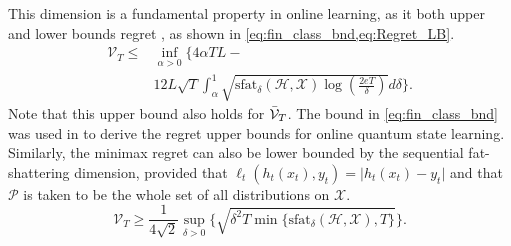This dimension is a fundamental property in online learning, as it both upper and lower bounds regret \citep{rakhlin2015online, rakhlin2015sequential}, as shown in \cref{eq:fin_class_bnd,eq:Regret_LB}.
\begin{equation}
\label{eq:fin_class_bnd}
\begin{aligned}
    \mathcal{V}_T \leq & \inf_{\alpha > 0} \Big\{ 4 \alpha T L - \\ & 12 L \sqrt{T} \int_{\alpha}^1 \sqrt{\text{sfat}_\delta (\mathcal{H}, \mathcal{X}) \log \left(\frac{2 e T}{\delta} \right)} d\delta \Big\}.
\end{aligned}
\end{equation}
Note that this upper bound also holds for $\Bar{\mathcal{V}}_T$. The bound in \cref{eq:fin_class_bnd} was used in \citet{aaronson2019online} to derive the regret upper bounds for online quantum state learning. Similarly, the minimax regret can also be lower bounded by the sequential fat-shattering dimension, provided that $\ell_t (h_t(x_t), y_t) = \vert h_t(x_t) - y_t \vert$ and that $\mathcal{P}$ is taken to be the whole set of all distributions on $\mathcal{X}$. 
\begin{equation}
\label{eq:Regret_LB}
    \mathcal{V}_T \geq \frac{1}{4 \sqrt{2}} \sup_{\delta > 0} \Big\{ \sqrt{\delta^2 T \min\{ \text{sfat}_\delta (\mathcal{H}, \mathcal{X}), T\}} \Big\}.
\end{equation}
